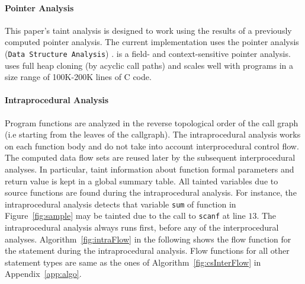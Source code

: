\paragraph{Pointer Analysis}
This paper's taint analysis is designed to work using the results of
a previously computed pointer analysis.
The current implementation uses the pointer analysis
\DSA (\texttt{Data Structure Analysis}) \cite{DSA:PLDI07}.
\DSA is a field- and context-sensitive pointer analysis.
\DSA uses full heap cloning (by acyclic call paths) and 
scales well with programs in a size range of 100K-200K lines of C code. 

\paragraph{Intraprocedural Analysis}
Program functions are analyzed in the reverse topological order
of the call graph (i.e starting from the leaves of the callgraph).
The intraprocedural analysis works on each function body and do
not take into account interprocedural control flow. The computed
data flow sets are reused later by the subsequent interprocedural
analyses. In particular, taint information about function
formal parameters and return value is kept in a global summary table.
All tainted variables due to source functions are found during
the intraprocedural analysis. For instance, the intraprocedural
analysis detects that variable \texttt{sum} of function \compute{}
in Figure~\ref{fig:sample} may be tainted due to the call to
\texttt{scanf} at line $13$. The intraprocedural analysis always
runs first, before any of the interprocedural analyses. 
Algorithm~\ref{fig:intraFlow} in the following shows the flow
function for the \callt statement during the intraprocedural analysis.
Flow functions for all other statement types are same as the ones
of Algorithm~\ref{fig:csInterFlow} in Appendix~\ref{app:algo}.
\IncMargin{1em}
